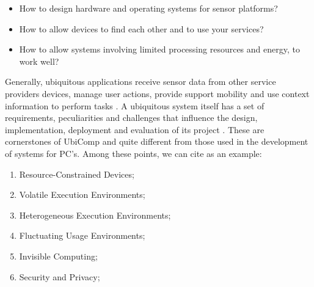 \documentclass{acm_proc_article-sp}
\begin{document}
\begin{itemize}
\item How to design hardware and operating systems for sensor platforms?
\item How to allow devices to find each other and to use your services?
\item How to allow systems involving limited processing resources and energy, to work well?
\end{itemize}

Generally, ubiquitous applications receive sensor data from other service providers devices, manage user actions, provide support mobility and use context information to perform tasks \cite{doesntfit}. A ubiquitous system itself has a set of requirements, peculiarities and challenges that influence the design, implementation, deployment and evaluation of its project \cite{krumm2009}. These are cornerstones of UbiComp and quite different from those used in the development of systems for PC's. Among these points, we can cite as an example:

\begin{enumerate}
\item Resource-Constrained Devices; 	
\item Volatile Execution Environments; 	
\item Heterogeneous Execution Environments;
\item Fluctuating Usage Environments;
\item Invisible Computing;
\item Security and Privacy;
\end{enumerate}
\end{document}
